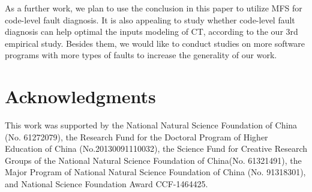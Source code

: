 \documentclass{sig-alternate-05-2015}
\begin{document}

As a further work, we plan to use the conclusion in this paper to utilize MFS for code-level fault diagnosis. It is also appealing to study whether code-level fault diagnosis can help optimal the inputs modeling of CT, according to the our 3rd empirical study. Besides them, we would like to conduct studies on more software programs with more types of faults to increase the generality of our work.

\section{Acknowledgments}
This work was supported by the National Natural Science Foundation of China (No. 61272079), the Research Fund for the Doctoral Program of Higher Education of China (No.20130091110032), the Science Fund for Creative Research Groups of the National Natural Science Foundation of China(No. 61321491), the Major Program of National Natural Science Foundation of China (No. 91318301), and National Science Foundation Award CCF-1464425.
\end{document}
